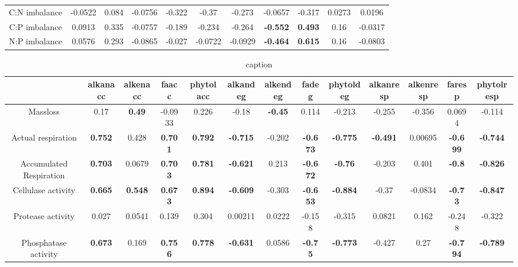 \documentclass[authoryear,preprint,review,12pt]{elsarticle}
\begin{document}
\begin{table}[h!]
\begin{center}
{\begin{tabular}{ccccccccccc}
  C:N imbalance & -0.0522 & 0.084 & -0.0756 & -0.322 & -0.37 & -0.273 & -0.0657 & -0.317 & 0.0273 & 0.0196 \\ 
  C:P imbalance & 0.0913 & 0.335 & -0.0757 & -0.189 & -0.234 & -0.264 & \textbf{ -0.552 } & \textbf{ 0.493 } & 0.16 & -0.0317 \\ 
  N:P imbalance & 0.0576 & 0.293 & -0.0865 & -0.027 & -0.0722 & -0.0929 & \textbf{ -0.464 } & \textbf{ 0.615 } & 0.16 & -0.0803 \\ 
   \hline
\end{tabular}
}
\end{center}
\end{table}
\newpage
\begin{landscape}
\begin{table}[h!]
\begin{center}
\caption{caption}
\label{corrtable_notlig}
{\tiny
\begin{tabular}{ccccccccccccc}
  \hline
 & alkanacc & alkenacc & faacc & phytolacc & alkandeg & alkendeg & fadeg & phytoldeg & alkanresp & alkenresp & faresp & phytolresp \\ 
  \hline
Massloss & 0.17 & \textbf{ 0.49 } & -0.0933 & 0.226 & -0.18 & \textbf{ -0.45 } & 0.114 & -0.213 & -0.255 & -0.356 & 0.0694 & -0.114 \\ 
  Actual respiration & \textbf{ 0.752 } & 0.428 & \textbf{ 0.701 } & \textbf{ 0.792 } & \textbf{ -0.715 } & -0.202 & \textbf{ -0.673 } & \textbf{ -0.775 } & \textbf{ -0.491 } & 0.00695 & \textbf{ -0.699 } & \textbf{ -0.744 } \\ 
  Accumulated Respiration & \textbf{ 0.703 } & 0.0679 & \textbf{ 0.703 } & \textbf{ 0.781 } & \textbf{ -0.621 } & 0.213 & \textbf{ -0.672 } & \textbf{ -0.76 } & -0.203 & 0.401 & \textbf{ -0.8 } & \textbf{ -0.826 } \\ 
  Cellulase activity & \textbf{ 0.665 } & \textbf{ 0.548 } & \textbf{ 0.673 } & \textbf{ 0.894 } & \textbf{ -0.609 } & -0.303 & \textbf{ -0.653 } & \textbf{ -0.884 } & -0.37 & -0.0834 & \textbf{ -0.73 } & \textbf{ -0.847 } \\ 
  Protease activity & 0.027 & 0.0541 & 0.139 & 0.304 & 0.00211 & 0.0222 & -0.158 & -0.315 & 0.0821 & 0.162 & -0.248 & -0.322 \\ 
  Phosphatase activity & \textbf{ 0.673 } & 0.169 & \textbf{ 0.756 } & \textbf{ 0.778 } & \textbf{ -0.631 } & 0.0586 & \textbf{ -0.75 } & \textbf{ -0.773 } & -0.427 & 0.27 & \textbf{ -0.794 } & \textbf{ -0.789 } \\ 

\end{tabular}}
\end{center}
\end{table}
\end{landscape}
\end{document}
